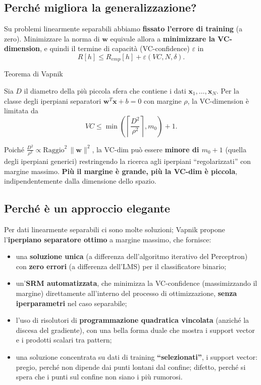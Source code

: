 \subsection{Perché migliora la
generalizzazione?}\label{perchuxe9-migliora-la-generalizzazione}

Su problemi linearmente separabili abbiamo \textbf{fissato l'errore di
training} (a zero). Minimizzare la norma di \(\mathbf{w}\) equivale
allora a \textbf{minimizzare la VC-dimension}, e quindi il termine di
capacità (VC-confidence) \(\varepsilon\) in \[
R[h] \le R_{emp}[h] + \varepsilon(VC, N, \delta).
\]

\begin{boxtheorem}{Teorema di Vapnik}

Sia \(D\) il diametro della più piccola sfera che contiene i dati
\(\mathbf{x}_1,\dots,\mathbf{x}_N\). Per la classe degli iperpiani
separatori \(\mathbf{w}^T\mathbf{x} + b = 0\) con margine \(\rho\), la
VC-dimension è limitata da \[
VC \le \min\left(\left\lceil\frac{D^2}{\rho^2}\right\rceil, m_0\right) + 1.
\]

\end{boxtheorem}

Poiché \(\frac{D^2}{\rho^2} \propto \text{Raggio}^2\,\|\mathbf{w}\|^2\),
la VC-dim può essere \textbf{minore di \(m_0 + 1\)} (quella degli
iperpiani generici) restringendo la ricerca agli iperpiani
``regolarizzati'' con margine massimo. \textbf{Più il margine è grande,
più la VC-dim è piccola}, indipendentemente dalla dimensione dello
spazio.

\subsection{Perché è un approccio
elegante}\label{perchuxe9-uxe8-un-approccio-elegante}

Per dati linearmente separabili ci sono molte soluzioni; Vapnik propone
l'\textbf{iperpiano separatore ottimo} a margine massimo, che fornisce:

\begin{itemize}
\tightlist
\item
  una \textbf{soluzione unica} (a differenza dell'algoritmo iterativo
  del Perceptron) con \textbf{zero errori} (a differenza dell'LMS) per
  il classificatore binario;
\item
  un'\textbf{SRM automatizzata}, che minimizza la VC-confidence
  (massimizzando il margine) direttamente all'interno del processo di
  ottimizzazione, \textbf{senza iperparametri} nel caso separabile;
\item
  l'uso di risolutori di \textbf{programmazione quadratica vincolata}
  (anziché la discesa del gradiente), con una bella forma duale che
  mostra i support vector e i prodotti scalari tra pattern;
\item
  una soluzione concentrata su dati di training
  \textbf{``selezionati''}, i support vector: pregio, perché non dipende
  dai punti lontani dal confine; difetto, perché si spera che i punti
  sul confine non siano i più rumorosi.
\end{itemize}

